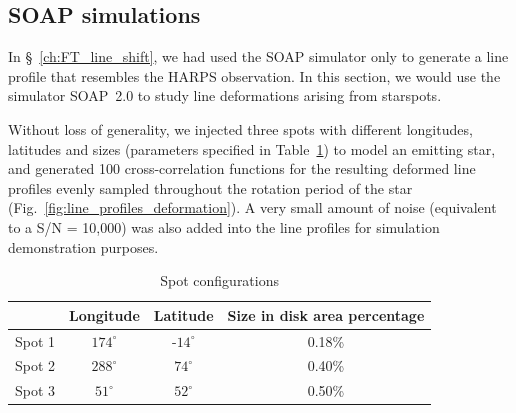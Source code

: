 
\subsection{SOAP simulations}
\label{sec:Simulations}

In \S~\ref{ch:FT_line_shift}, we had used the SOAP simulator only to generate a line profile that resembles the HARPS observation. In this section, we would use the simulator SOAP~2.0 to study line deformations arising from starspots. 

Without loss of generality, we injected three spots with different longitudes, latitudes and sizes (parameters specified in Table~\ref{table:spot_configurations}) to model an emitting star, and generated 100 cross-correlation functions for the resulting  deformed line profiles evenly sampled throughout the rotation period of the star (Fig.~\ref{fig:line_profiles_deformation}). A very small amount of noise (equivalent to a S/N = 10,000) was also added into the line profiles for simulation demonstration purposes. 

\begin{table}[htbp]
\centering
\begin{tabular}{|c|c|c|c|}
\hline 
 & Longitude & Latitude & Size in disk area percentage\\ 
\hline 
Spot 1 & $174^\circ$ & -$14^\circ$ & 0.18\% \\ 
\hline 
Spot 2 & $288^\circ$ & $74^\circ$  & 0.40\% \\ 
\hline 
Spot 3 & $51^\circ$  & $52^\circ$  & 0.50\% \\ 
\hline 
\end{tabular} 
\caption{Spot configurations}
\label{table:spot_configurations}
\end{table}

